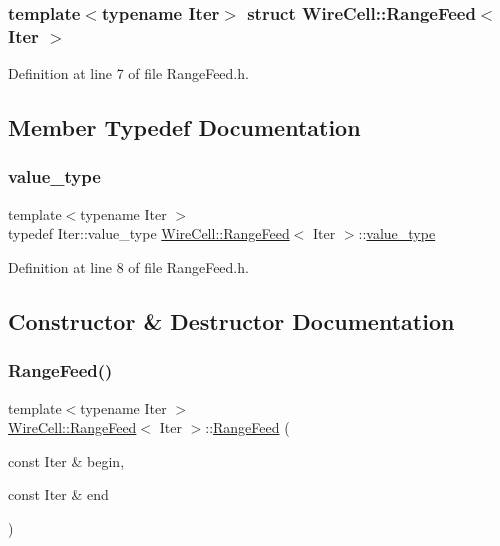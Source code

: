 \subsubsection*{template$<$typename Iter$>$\newline
struct Wire\+Cell\+::\+Range\+Feed$<$ Iter $>$}



Definition at line 7 of file Range\+Feed.\+h.



\subsection{Member Typedef Documentation}
\mbox{\label{struct_wire_cell_1_1_range_feed_a32b94891e47c23ea05844c6bd6d0ace7}} 
\subsubsection{\texorpdfstring{value\+\_\+type}{value\_type}}
{\footnotesize\ttfamily template$<$typename Iter $>$ \\
typedef Iter\+::value\+\_\+type \hyperlink{struct_wire_cell_1_1_range_feed}{Wire\+Cell\+::\+Range\+Feed}$<$ Iter $>$\+::\hyperlink{struct_wire_cell_1_1_range_feed_a32b94891e47c23ea05844c6bd6d0ace7}{value\+\_\+type}}



Definition at line 8 of file Range\+Feed.\+h.



\subsection{Constructor \& Destructor Documentation}
\mbox{\label{struct_wire_cell_1_1_range_feed_a6445ad7465daf6dd59c58606f11030ed}} 
\subsubsection{\texorpdfstring{Range\+Feed()}{RangeFeed()}}
{\footnotesize\ttfamily template$<$typename Iter $>$ \\
\hyperlink{struct_wire_cell_1_1_range_feed}{Wire\+Cell\+::\+Range\+Feed}$<$ Iter $>$\+::\hyperlink{struct_wire_cell_1_1_range_feed}{Range\+Feed} (\begin{DoxyParamCaption}\item[{const Iter \&}]{begin,  }\item[{const Iter \&}]{end }\end{DoxyParamCaption})\hspace{0.3cm}{\ttfamily [inline]}}



